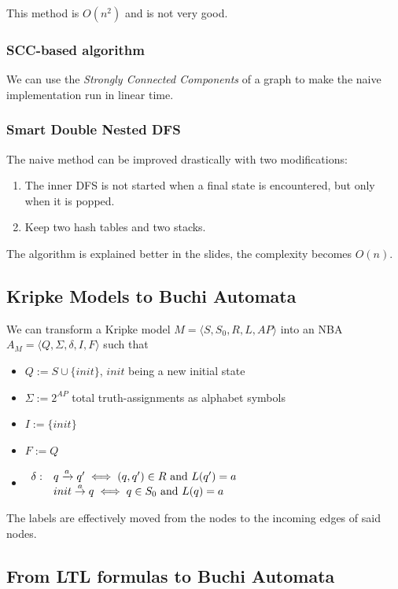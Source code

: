 \documentclass{article}
\begin{document}
This method is $O(n^2)$ and is not very good.

\subsubsection{SCC-based algorithm}
We can use the \textit{Strongly Connected Components} of a graph to make the naive implementation run in linear time.

\subsubsection{Smart Double Nested DFS}
The naive method can be improved drastically with two modifications:
\begin{enumerate}
    \item The inner DFS is not started when a final state is encountered, but only when it is popped.
    \item Keep two hash tables and two stacks.
\end{enumerate}

The algorithm is explained better in the slides, the complexity becomes $O(n)$.

\subsection{Kripke Models to Buchi Automata}
We can transform a Kripke model $M=\langle S, S_0, R, L, AP\rangle$ into an NBA $A_M=\langle Q,\Sigma,\delta,I,F\rangle$ such that
\begin{itemize}
    \item $Q := S\cup \{init\}$, $init$ being a new initial state
    \item $\Sigma := 2^{AP}$ total truth-assignments as alphabet symbols
    \item $I := \{init\}$
    \item $F:=Q$
    \item $\begin{array}{rl}\delta: & q\xrightarrow{a} q' \iff (q,q')\in R \text{ and } L(q')=a\\
        & init\overset a \rightarrow q \iff q\in S_0 \text{ and } L(q)=a\end{array}$
\end{itemize}

The labels are effectively moved from the nodes to the incoming edges of said nodes.

\subsection{From LTL formulas to Buchi Automata}
\end{document}
